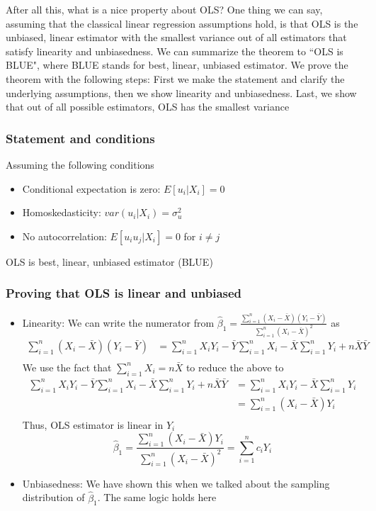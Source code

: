 \documentclass[12pt]{article}
\theoremstyle{definition}
\theoremstyle{property}
\theoremstyle{assumption}
\theoremstyle{example}
\theoremstyle{comment}
\begin{document}
After all this, what is a nice property about OLS? One thing we can say, assuming that the classical linear regression assumptions hold, is that OLS is the unbiased, linear estimator with the smallest variance out of all estimators that satisfy linearity and unbiasedness. We can summarize the theorem to ``OLS is BLUE", where BLUE stands for best, linear, unbiased estimator. We prove the theorem with the following steps: First we make the statement and clarify the underlying assumptions, then we show linearity and unbiasedness. Last, we show that out of all possible estimators, OLS has the smallest variance
\subsubsection{Statement and conditions}
Assuming the following conditions
\begin{itemize}
\item Conditional expectation is zero: $E[u_i|X_i]=0$
\item Homoskedasticity: $var(u_i|X_i)=\sigma_u^2$
\item No autocorrelation: $E[u_iu_j|X_i]=0$ for $i\neq j$
\end{itemize}
OLS is best, linear, unbiased estimator (BLUE)
\subsubsection{Proving that OLS is linear and unbiased}
\begin{itemize}
\item Linearity: We can write the numerator from $\hat{\beta}_1=\frac{\sum_{i=1}^n (X_i-\bar{X})(Y_i-\bar{Y})}{\sum_{i=1}^n(X_i-\bar{X})^2 }$ as
\[
\begin{aligned}
\sum_{i=1}^n (X_i-\bar{X})(Y_i-\bar{Y})&=\sum_{i=1}^n X_iY_i - \bar{Y}\sum_{i=1}^nX_i -\bar{X}\sum_{i=1}^nY_i + n\bar{X}\bar{Y}\\
\end{aligned}
\]
We use the fact that $\sum_{i=1}^nX_i = n\bar{X}$ to reduce the above to
\[
\begin{aligned}
\sum_{i=1}^n X_iY_i - \bar{Y}\sum_{i=1}^nX_i -\bar{X}\sum_{i=1}^nY_i + n\bar{X}\bar{Y}&=\sum_{i=1}^n X_iY_i  -\bar{X}\sum_{i=1}^nY_i \\
&=\sum_{i=1}^n (X_i-\bar{X})Y_i \\
\end{aligned}
\]
Thus, OLS estimator is linear in $Y_i$
\[
\hat{\beta}_1 = \frac{\sum_{i=1}^n (X_i-\bar{X})Y_i}{\sum_{i=1}^n(X_i-\bar{X})^2 } = \sum_{i=1}^n c_iY_i
\]

\item Unbiasedness: We have shown this when we talked about the sampling distribution of $\hat{\beta}_1$. The same logic holds here
\end{itemize}
\end{document}
